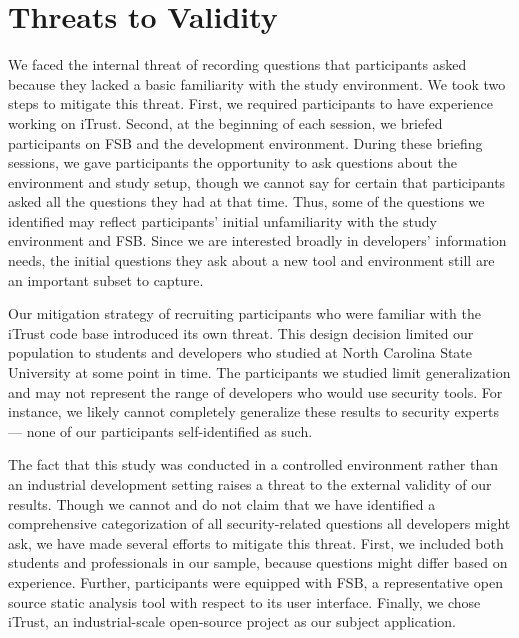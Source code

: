 \documentclass[10pt,journal,compsoc]{IEEEtran}
\begin{document}



\section{Threats to Validity}
\label{limits}
We faced the internal threat of recording questions that participants asked because they lacked a basic familiarity with the study environment. 
We took two steps to mitigate this threat.
First, we required participants to have experience working on iTrust.
Second, at the  beginning of each session, we briefed participants on FSB and the development environment. 
During these briefing sessions, we gave participants the opportunity to ask questions about the environment and study setup, though we cannot say for certain that participants asked all the questions they had at that time.
Thus, some of the questions we identified may reflect participants' initial unfamiliarity with the study environment and FSB.
Since we are interested broadly in developers' information needs, the initial questions they ask about a new tool and environment still are an important subset to capture.

Our mitigation strategy of recruiting participants who were familiar with the iTrust code base introduced its own threat. 
This design decision limited our population to students and developers who studied at North Carolina State University at some point in time.
The participants we studied limit generalization and may not represent the range of developers who would use security tools. 
For instance, we likely cannot completely generalize these results to security experts --- none of our participants self-identified as such.

The fact that this study was conducted in a controlled environment rather than an industrial development setting raises a threat to the external validity of our results. 
Though we cannot and do not claim that we have identified a comprehensive categorization of all security-related questions all developers might ask, we have made several efforts to mitigate this threat.
First, we included both students and professionals in our sample, because questions might differ based on experience.
Further, participants were equipped with FSB, a representative open source static analysis tool with respect to its user interface.
Finally, we chose iTrust, an industrial-scale open-source project as our subject application.
\end{document}
